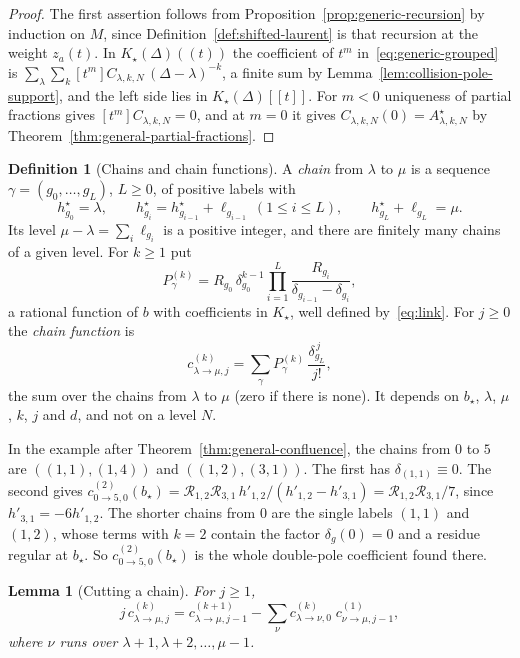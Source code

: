 \documentclass[twoside,10pt]{article}
\numberwithin{equation}{section}
\theoremstyle{slbody}
\newtheorem{lemma}[theorem]{Lemma}
\theoremstyle{definition}
\newtheorem{definition}[theorem]{Definition}
\theoremstyle{remark}
\begin{document}
\begin{proof}
The first assertion follows from
Proposition~\ref{prop:generic-recursion} by induction on \(M\), since
Definition~\ref{def:shifted-laurent} is that recursion at the weight
\(z_a(t)\).  In $K_\star(\Delta)((t))$ the
coefficient of $t^m$ in~\eqref{eq:generic-grouped} is
$\sum_\lambda\sum_k[t^m]C_{\lambda,k,N}\,(\Delta-\lambda)^{-k}$, a finite sum
by Lemma~\ref{lem:collision-pole-support}, and the left side lies in
$K_\star(\Delta)[[t]]$.  For $m<0$ uniqueness of partial fractions gives
$[t^m]C_{\lambda,k,N}=0$, and at $m=0$ it gives
$C_{\lambda,k,N}(0)=A^\star_{\lambda,k,N}$ by
Theorem~\ref{thm:general-partial-fractions}.
\end{proof}

\begin{definition}[Chains and chain functions]\label{def:chains}
A \emph{chain} from $\lambda$ to $\mu$ is a sequence $\gamma=(g_0,\dots,g_L)$,
$L\geq0$, of positive labels with
\[
 h^\star_{g_0}=\lambda,\qquad h^\star_{g_i}=h^\star_{g_{i-1}}+\ell_{g_{i-1}}\ (1\leq i\leq L),
 \qquad h^\star_{g_L}+\ell_{g_L}=\mu .
\]
Its level $\mu-\lambda=\sum_i\ell_{g_i}$ is a positive integer, and there are
finitely many chains of a given level.  For $k\geq1$ put
\[
 P^{(k)}_\gamma=R_{g_0}\,\delta_{g_0}^{k-1}\prod_{i=1}^{L}
 \frac{R_{g_i}}{\delta_{g_{i-1}}-\delta_{g_i}},
\]
a rational function of $b$ with coefficients in $K_\star$, well defined
by~\eqref{eq:link}.  For $j\geq0$ the \emph{chain function} is
\[
 c^{(k)}_{\lambda\to\mu,j}=\sum_{\gamma}P^{(k)}_\gamma\,
 \frac{\delta_{g_L}^{\,j}}{j!},
\]
the sum over the chains from $\lambda$ to $\mu$ (zero if there is none).  It
depends on $b_\star$, $\lambda$, $\mu$, $k$, $j$ and $d$, and not on a level
$N$.
\end{definition}

In the example after Theorem~\ref{thm:general-confluence}, the chains from
$0$ to $5$ are $((1,1),(1,4))$ and $((1,2),(3,1))$.  The first has
$\delta_{(1,1)}\equiv0$.  The second gives
$c^{(2)}_{0\to5,0}(b_\star)={\mathcal R}_{1,2}{\mathcal R}_{3,1}\,
h'_{1,2}/(h'_{1,2}-h'_{3,1})={\mathcal R}_{1,2}{\mathcal R}_{3,1}/7$, since
$h'_{3,1}=-6h'_{1,2}$.  The shorter chains from $0$ are the single labels
$(1,1)$ and $(1,2)$, whose terms with $k=2$ contain the factor
$\delta_g(0)=0$ and a residue regular at $b_\star$.  So
$c^{(2)}_{0\to5,0}(b_\star)$ is the whole double-pole coefficient found
there.

\begin{lemma}[Cutting a chain]\label{lem:cutting}
For $j\geq1$,
\[
 j\,c^{(k)}_{\lambda\to\mu,j}
 =c^{(k+1)}_{\lambda\to\mu,j-1}
 -\sum_{\nu}c^{(k)}_{\lambda\to\nu,0}\;c^{(1)}_{\nu\to\mu,j-1},
\]
where $\nu$ runs over $\lambda+1,\lambda+2,\dots,\mu-1$.
\end{lemma}
\end{document}
